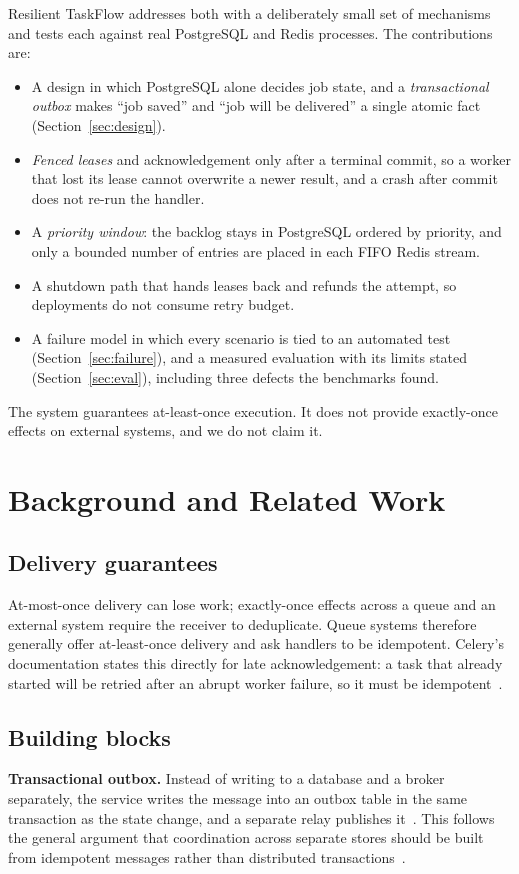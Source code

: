 \documentclass[conference]{IEEEtran}
\begin{document}
Resilient TaskFlow addresses both with a deliberately small set of mechanisms and tests each against real PostgreSQL and Redis processes. The contributions are:
\begin{itemize}
  \item A design in which PostgreSQL alone decides job state, and a \emph{transactional outbox} makes ``job saved'' and ``job will be delivered'' a single atomic fact (Section~\ref{sec:design}).
  \item \emph{Fenced leases} and acknowledgement only after a terminal commit, so a worker that lost its lease cannot overwrite a newer result, and a crash after commit does not re-run the handler.
  \item A \emph{priority window}: the backlog stays in PostgreSQL ordered by priority, and only a bounded number of entries are placed in each FIFO Redis stream.
  \item A shutdown path that hands leases back and refunds the attempt, so deployments do not consume retry budget.
  \item A failure model in which every scenario is tied to an automated test (Section~\ref{sec:failure}), and a measured evaluation with its limits stated (Section~\ref{sec:eval}), including three defects the benchmarks found.
\end{itemize}
The system guarantees at-least-once execution. It does not provide exactly-once effects on external systems, and we do not claim it.

\section{Background and Related Work}
\subsection{Delivery guarantees}
At-most-once delivery can lose work; exactly-once effects across a queue and an external system require the receiver to deduplicate. Queue systems therefore generally offer at-least-once delivery and ask handlers to be idempotent. Celery's documentation states this directly for late acknowledgement: a task that already started will be retried after an abrupt worker failure, so it must be idempotent~\cite{celeryoptimizing}.

\subsection{Building blocks}
\textbf{Transactional outbox.} Instead of writing to a database and a broker separately, the service writes the message into an outbox table in the same transaction as the state change, and a separate relay publishes it~\cite{richardson2018patterns}. This follows the general argument that coordination across separate stores should be built from idempotent messages rather than distributed transactions~\cite{helland2007beyond}.
\end{document}

